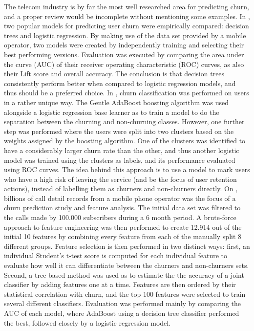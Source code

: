 \documentclass{kththesis}
\begin{document}
The telecom industry is by far the most well researched area for predicting churn, and a proper review would be incomplete without mentioning some examples. In \citep{Hassouna2015}, two popular models for predicting user churn were empirically compared: decision trees and logistic regression. By making use of the data set provided by a mobile operator, two models were created by independently training and selecting their best performing versions. Evaluation was executed by comparing the area under the curve (AUC) of their receiver operating characteristic (ROC) curves, as also their Lift score and overall accuracy. The conclusion is that decision trees consistently perform better when compared to logistic regression models, and thus should be a preferred choice. In \citep{Lu2014}, churn classification was performed on users in a rather unique way. The Gentle AdaBoost boosting algorithm was used alongside a logistic regression base learner as to train a model to do the separation between the churning and non-churning classes. However, one further step was performed where the users were split into two clusters based on the weights assigned by the boosting algorithm. One of the clusters was identified to have a considerably larger churn rate than the other, and thus another logistic model was trained using the clusters as labels, and its performance evaluated using ROC curves. The idea behind this approach is to use a model to mark users who have a high risk of leaving the service (and be the focus of user retention actions), instead of labelling them as churners and non-churners directly. On \citep{Khan2015}, billions of call detail records from a mobile phone operator was the focus of a churn prediction study and feature analysis. The initial data set was filtered to the calls made by 100.000 subscribers during a 6 month period. A brute-force approach to feature engineering was then performed to create 12.914 out of the initial 10 features by combining every feature from each of the manually split 8 different groups. Feature selection is then performed in two distinct ways: first, an individual Student's t-test score is computed for each individual feature to evaluate how well it can differentiate between the churners and non-churners sets. Second, a tree-based method was used as to estimate the the accuracy of a joint classifier by adding features one at a time. Features are then ordered by their statistical correlation with churn, and the top 100 features were selected to train several different classifiers. Evaluation was performed mainly by comparing the AUC of each model, where AdaBoost using a decision tree classifier performed the best, followed closely by a logistic regression model.
\end{document}
